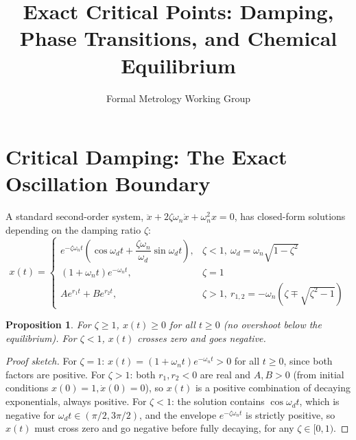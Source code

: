 \documentclass[10pt,journal,compsoc]{IEEEtran}
\newtheorem{proposition}{Proposition}
\begin{document}
\title{Exact Critical Points: Damping, Phase Transitions, and Chemical Equilibrium}
\author{Formal Metrology Working Group}


\maketitle

\section{Critical Damping: The Exact Oscillation Boundary}
A standard second-order system, $\ddot x + 2\zeta\omega_n\dot x+\omega_n^2 x=0$, has closed-form solutions depending on the damping ratio $\zeta$:
\begin{equation}
    x(t)=\begin{cases}
        e^{-\zeta\omega_n t}\left(\cos\omega_d t+\dfrac{\zeta\omega_n}{\omega_d}\sin\omega_d t\right), & \zeta<1,\ \omega_d=\omega_n\sqrt{1-\zeta^2} \\
        (1+\omega_n t)e^{-\omega_n t}, & \zeta=1 \\
        Ae^{r_1 t}+Be^{r_2 t}, & \zeta>1,\ r_{1,2}=-\omega_n(\zeta\mp\sqrt{\zeta^2-1})
    \end{cases}
\end{equation}

\begin{proposition}
For $\zeta\ge 1$, $x(t)\ge 0$ for all $t\ge0$ (no overshoot below the equilibrium). For $\zeta<1$, $x(t)$ crosses zero and goes negative.
\end{proposition}
\begin{proof}[Proof sketch]
For $\zeta=1$: $x(t)=(1+\omega_nt)e^{-\omega_nt}>0$ for all $t\ge0$, since both factors are positive. For $\zeta>1$: both $r_1,r_2<0$ are real and $A,B>0$ (from initial conditions $x(0)=1,\dot x(0)=0$), so $x(t)$ is a positive combination of decaying exponentials, always positive. For $\zeta<1$: the solution contains $\cos\omega_dt$, which is negative for $\omega_dt\in(\pi/2,3\pi/2)$, and the envelope $e^{-\zeta\omega_nt}$ is strictly positive, so $x(t)$ must cross zero and go negative before fully decaying, for any $\zeta\in[0,1)$.
\end{proof}
\end{document}
